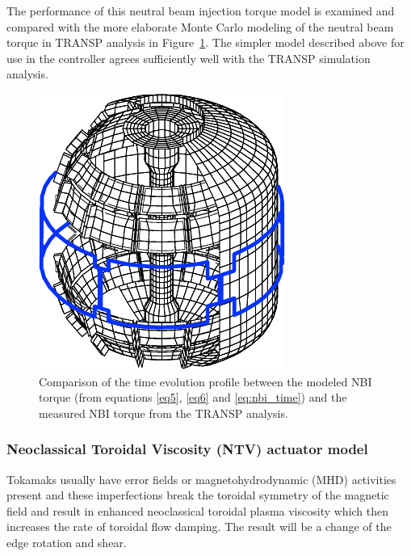 \documentclass[12pt]{iopart}
\begin{document}
The performance of this neutral beam injection torque model is examined and compared with the more elaborate Monte Carlo modeling of the neutral beam torque in TRANSP analysis in Figure~\ref{fig:Fullnbi}. The simpler model described above for use in the controller agrees sufficiently well with the TRANSP simulation analysis.
\begin{figure}
\centering
\includegraphics{imene_figs/fig5} %
\caption{Comparison of the time evolution profile between the modeled NBI torque (from equations \ref{eq5}, \ref{eq6} and \ref{eq:nbi_time}) and the measured NBI torque from the TRANSP analysis.}
\label{fig:Fullnbi}
\end{figure}



\subsubsection{Neoclassical Toroidal Viscosity (NTV) actuator model}
 \label{TNTV}

Tokamaks usually have error fields or magnetohydrodynamic (MHD) activities present and these imperfections break the toroidal symmetry of the magnetic field and result in enhanced neoclassical toroidal plasma viscosity which then increases the rate of toroidal flow damping. The result will be a change of the edge rotation and shear. 
\end{document}
